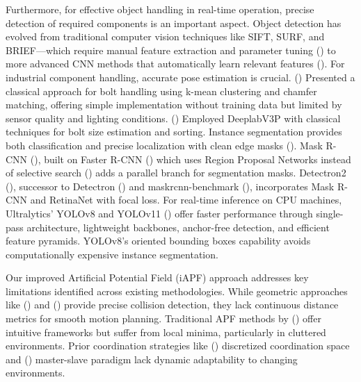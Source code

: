 \documentclass[utf8]{FrontiersinHarvard}
\begin{document}
Furthermore, for effective object handling in real-time operation, precise detection of required components is an important aspect. Object detection has evolved from traditional computer vision techniques like SIFT, SURF, and BRIEF—which require manual feature extraction and parameter tuning (\citet{CVvsDL}) to more advanced CNN methods that automatically learn relevant features (\citet{CNN_advance}). For industrial component handling, accurate pose estimation is crucial. (\citet{me_1}) Presented a classical approach for bolt handling using k-mean clustering and chamfer matching, offering simple implementation without training data but limited by sensor quality and lighting conditions. (\citet{me}) Employed DeeplabV3P with classical techniques for bolt size estimation and sorting. Instance segmentation provides both classification and precise localization with clean edge masks (\citet{instance_seg_survey}). Mask R-CNN (\citet{MASKRCNN}), built on Faster R-CNN (\citet{FasterR-CNN}) which uses Region Proposal Networks instead of selective search (\citet{fastrcnn, RCNN}) adds a parallel branch for segmentation masks. Detectron2 (\citet{detectron2}), successor to Detectron (\citet{Detectron2018}) and maskrcnn-benchmark (\citet{massa2018mrcnn}), incorporates Mask R-CNN and RetinaNet with focal loss. For real-time inference on CPU machines, Ultralytics' YOLOv8 and YOLOv11 (\citet{yolov8_ultralytics, yolo11_ultralytic}) offer faster performance through single-pass architecture, lightweight backbones, anchor-free detection, and efficient feature pyramids. YOLOv8's oriented bounding boxes capability avoids computationally expensive instance segmentation.

Our improved Artificial Potential Field (iAPF) approach addresses key limitations identified across existing methodologies. While geometric approaches like (\citet{LUMELSKY198555}) and (\citet{chang1990collision}) provide precise collision detection, they lack continuous distance metrics for smooth motion planning. Traditional APF methods by (\citet{khatib}) offer intuitive frameworks but suffer from local minima, particularly in cluttered environments. Prior coordination strategies like (\citet{MONTANO201673}) discretized coordination space and (\citet{MALVIDOFRESNILLO2023102559}) master-slave paradigm lack dynamic adaptability to changing environments.
\end{document}
